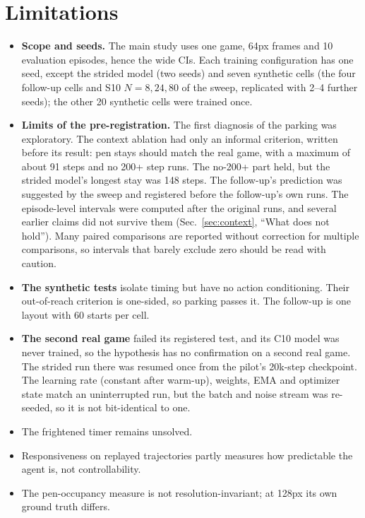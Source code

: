 \documentclass[11pt]{article}
\begin{document}
\section{Limitations}
\label{sec:limits}
\begin{itemize}
\item \textbf{Scope and seeds.} The main study uses one game, 64px frames and 10 evaluation episodes, hence the wide
CIs. Each training configuration has one seed, except the strided model (two seeds) and seven synthetic cells (the
four follow-up cells and S10 $N{=}8, 24, 80$ of the sweep, replicated with 2--4 further seeds); the other 20
synthetic cells were trained once.
\item \textbf{Limits of the pre-registration.} The first diagnosis of the parking was exploratory. The context
ablation had only an informal criterion, written before its result: pen stays should match the real game, with a
maximum of about 91 steps and no 200+ step runs. The no-200+ part held, but the strided model's longest stay was 148
steps. The follow-up's prediction was suggested by the sweep and registered before the follow-up's own runs. The
episode-level intervals were computed after the original runs, and several earlier claims did not survive them
(Sec.~\ref{sec:context}, ``What does not hold''). Many paired comparisons are reported without
correction for multiple comparisons, so intervals that barely exclude zero should be read with caution.
\item \textbf{The synthetic tests} isolate timing but have no action conditioning. Their out-of-reach criterion is
one-sided, so parking passes it. The follow-up is one layout with 60 starts per cell.
\item \textbf{The second real game} failed its registered test, and its C10 model was never trained, so the hypothesis
has no confirmation on a second real game. The strided run there was resumed once from the pilot's 20k-step checkpoint.
The learning rate (constant after warm-up), weights, EMA and optimizer state match an uninterrupted run, but the
batch and noise stream was re-seeded, so it is not bit-identical to one.
\item The frightened timer remains unsolved.
\item Responsiveness on replayed trajectories partly measures how predictable the agent is, not controllability.
\item The pen-occupancy measure is not resolution-invariant; at 128px its own ground truth differs.
\end{itemize}
\end{document}
